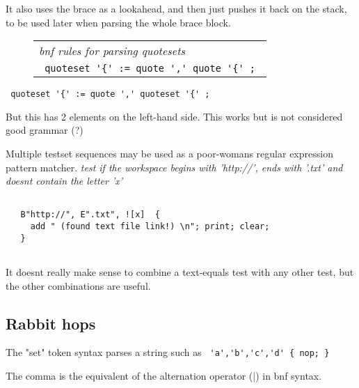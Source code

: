 \documentclass[a4paper,12pt]{article}
\begin{document}
  It also uses the brace as a lookahead, and then just pushes it
  back on the stack, to be used later when parsing the whole brace block.
 \begin{figure}
 \begin{tabular}{ l }
 \emph{ bnf rules for parsing quotesets } \\ 
 \verb| quoteset '{' := quote ',' quote '{' ; |
 \end{tabular} 
 \end{figure} 
 \verb| quoteset '{' := quote ',' quoteset '{' ; |


  But this has 2 elements on the left-hand side. This works but is
  not considered good grammar (?)

 Multiple testset sequences may be used as a poor-womans
 regular expression pattern matcher.
 \emph{ test if the workspace begins with 'http://', ends with '.txt' and }
 \emph{ doesnt contain the letter 'x' } 
 \begin{lstlisting}[breaklines] 

   B"http://", E".txt", ![x]  {
     add " (found text file link!) \n"; print; clear;
   }
 
 \end{lstlisting} 


 It doesnt really make sense to combine a text-equals test with
 any other test, but the other combinations are useful.

\subsection{Rabbit hops}

  The "set" token syntax parses a string such as 
 \verb| 'a','b','c','d' { nop; } |


  The comma is the equivalent of the alternation operator (|) in
  bnf syntax.
\end{document}
